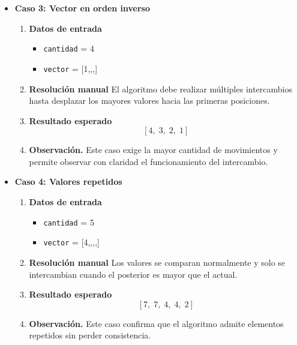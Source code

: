 \documentclass[12pt,twoside]{book}
\begin{document}
\begin{itemize}
							
							\item \textbf{Caso 3: Vector en orden inverso}
							\begin{enumerate}
								\item \textbf{Datos de entrada}
								\begin{itemize}
									\item \texttt{cantidad} = 4
									\item \texttt{vector} = [1,,,]
								\end{itemize}
								\item \textbf{Resolución manual}
								El algoritmo debe realizar múltiples intercambios hasta desplazar los mayores valores hacia las primeras posiciones.
								\item \textbf{Resultado esperado}
								\[
								[4,\; 3,\; 2,\; 1]
								\]
								\item \textbf{Observación.} Este caso exige la mayor cantidad de movimientos y permite observar con claridad el funcionamiento del intercambio.
							\end{enumerate}
							
							
							\item \textbf{Caso 4: Valores repetidos}
							\begin{enumerate}
								\item \textbf{Datos de entrada}
								\begin{itemize}
									\item \texttt{cantidad} = 5
									\item \texttt{vector} = [4,,,,]
								\end{itemize}
								\item \textbf{Resolución manual}
								Los valores se comparan normalmente y solo se intercambian cuando el posterior es mayor que el actual.
								\item \textbf{Resultado esperado}
								\[
								[7,\; 7,\; 4,\; 4,\; 2]
								\]
								\item \textbf{Observación.} Este caso confirma que el algoritmo admite elementos repetidos sin perder consistencia.
							\end{enumerate}
							
							

\end{itemize}
\end{document}
